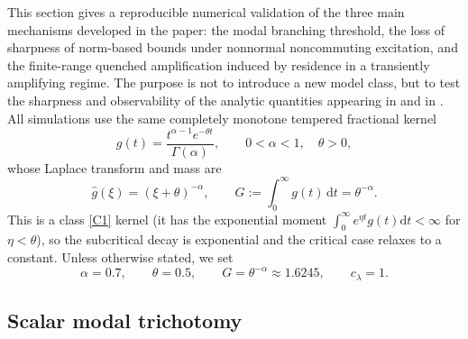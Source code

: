\documentclass[11pt]{article}
\theoremstyle{plain}
\theoremstyle{definition}
\theoremstyle{remark}
\newcommand{\dd}{\mathrm{d}}
\newcommand{\Laplace}{\widehat}
\begin{document}
This section gives a reproducible numerical validation of the three main mechanisms developed in
the paper: the modal branching threshold, the loss of sharpness of norm-based bounds under
nonnormal noncommuting excitation, and the finite-range quenched amplification induced by
residence in a transiently amplifying regime. The purpose is not to introduce a new model class,
but to test the sharpness and observability of the analytic quantities appearing in
 and in . All simulations
use the same completely monotone tempered fractional kernel
\begin{equation}
    g(t)=\frac{t^{\alpha-1}e^{-\theta t}}{\Gamma(\alpha)},
    \qquad 0<\alpha<1,\quad \theta>0,
    \label{eq:numerical-tempered-kernel}
\end{equation}
whose Laplace transform and mass are
\begin{equation}
    \Laplace g(\xi)=(\xi+\theta)^{-\alpha},
    \qquad
    G:=\int_0^\infty g(t)\,\dd t=\theta^{-\alpha}.
    \label{eq:numerical-kernel-mass}
\end{equation}
This is a class \ref{C1} kernel (it has the exponential moment $\int_0^\infty e^{\eta t}g(t)\dd t
<\infty$ for $\eta<\theta$), so the subcritical decay is exponential and the critical case relaxes
to a constant. Unless otherwise stated, we set
\begin{equation}
    \alpha=0.7,
    \qquad
    \theta=0.5,
    \qquad
    G=\theta^{-\alpha}\approx 1.6245,
    \qquad
    c_\lambda=1.
    \label{eq:numerical-global-parameters}
\end{equation}

\subsection{Scalar modal trichotomy}
\label{subsec:numerical-modal-trichotomy}
\end{document}
